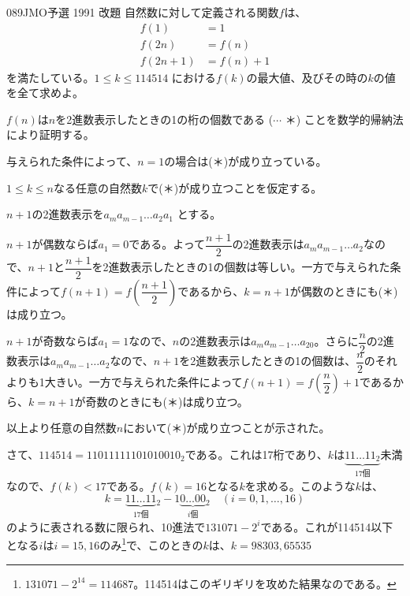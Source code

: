 \begin{prob}{089}{}{JMO予選 1991 改題}
 自然数に対して定義される関数$f$は、
 \begin{align*}
  f(1)&=1 \\
  f(2n)&=f(n) \\
  f(2n+1)&=f(n)+1
 \end{align*}
 を満たしている。$1\le k \le 114514$ における$f(k)$の最大値、及びその時の$k$の値を全て求めよ。
\end{prob}
$f(n)$は$n$を2進数表示したときの1の桁の個数である ($\cdots$ ＊) ことを数学的帰納法により証明する。

与えられた条件によって、$n=1$の場合は(＊)が成り立っている。

$1\le k \le n$なる任意の自然数$k$で(＊)が成り立つことを仮定する。

$n+1$の2進数表示を$a_ma_{m-1}\dots a_2a_1$ とする。

$n+1$が偶数ならば$a_1=0$である。よって$\dfrac{n+1}{2}$の2進数表示は$a_ma_{m-1}\dots a_2$なので、$n+1$と$\dfrac{n+1}{2}$を2進数表示したときの1の個数は等しい。一方で与えられた条件によって$f(n+1)=f\left(\dfrac{n+1}{2}\right)$であるから、$k=n+1$が偶数のときにも(＊)は成り立つ。

$n+1$が奇数ならば$a_1=1$なので、$n$の2進数表示は$a_ma_{m-1}\dots a_20$。さらに$\dfrac{n}{2}$の2進数表示は$a_ma_{m-1}\dots a_2$なので、$n+1$を2進数表示したときの1の個数は、$\dfrac{n}{2}$のそれよりも1大きい。一方で与えられた条件によって$f(n+1)=f\left(\dfrac{n}{2}\right)+1$であるから、$k=n+1$が奇数のときにも(＊)は成り立つ。

以上より任意の自然数$n$において(＊)が成り立つことが示された。

さて、$114514=11011111101010010_2$である。これは17桁であり、$k$は$\underbrace{11\dots 11_2}_{\text{17個}}$未満なので、$f(k)<17$である。$f(k)=16$となる$k$を求める。このような$k$は、
\[ k=\underbrace{11\dots 11}_{\text{17個}}{}_2 - 1\underbrace{0\dots 00}_{i\text{個}}{}_2 \quad (i=0, 1,\dots , 16) \]
のように表される数に限られ、10進法で$131071-2^i$である。これが114514以下となる$i$は$i=15,16$のみ\footnote{$131071-2^{14}=114687$。114514はこのギリギリを攻めた結果なのである。}で、このときの$k$は、$k=98303, 65535$